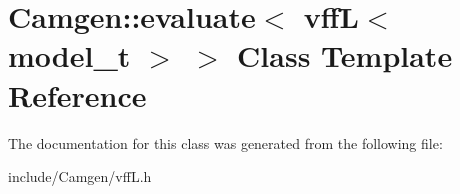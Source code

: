 \hypertarget{a00203}{\section{Camgen\-:\-:evaluate$<$ vff\-L$<$ model\-\_\-t $>$ $>$ Class Template Reference}
\label{a00203}
}


The documentation for this class was generated from the following file\-:\begin{DoxyCompactItemize}
\item 
include/\-Camgen/vff\-L.\-h\end{DoxyCompactItemize}
